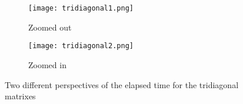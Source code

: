 \documentclass{article}
\begin{document}
\begin{enumerate}
{    \begin{figure}[h]
      \centering
      \begin{subfigure}[b]{0.75\textwidth}
        \texttt{[image: tridiagonal1.png]} %
        \caption{Zoomed out}
        \label{fig:subfig1}
      \end{subfigure}
      \hfill
      \begin{subfigure}[b]{0.75\textwidth}
        \texttt{[image: tridiagonal2.png]} %
        \caption{Zoomed in}
        \label{fig:subfig2}
      \end{subfigure}
      \caption{Two different perspectives of the elapsed time for the tridiagonal matrixes}
      \label{fig:mainfig}
    \end{figure}
}
\end{enumerate}
\end{document}
